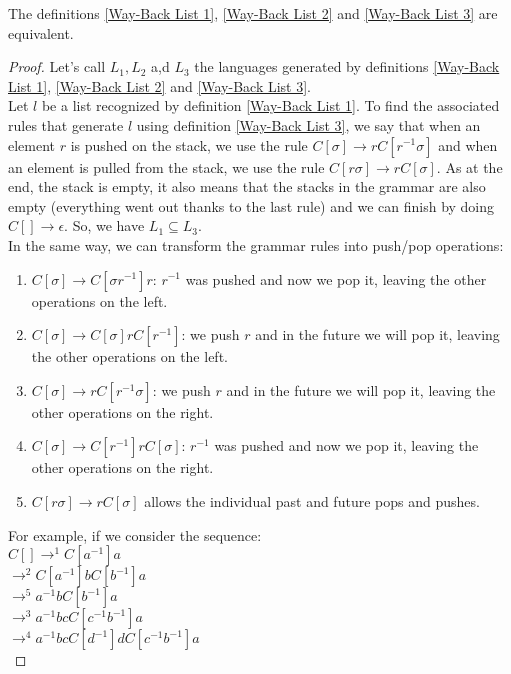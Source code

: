 \documentclass[10pt,a4paper,draft]{article}
\begin{document}
\begin{theorem}
The definitions \ref{Way-Back List 1}, \ref{Way-Back List 2} and \ref{Way-Back List 3} are equivalent.
\end{theorem}

\begin{proof}
Let's call $L_1, L_2$ a,d $L_3$ the languages generated by definitions \ref{Way-Back List 1}, \ref{Way-Back List 2} and \ref{Way-Back List 3}. \\
Let $l$ be a list recognized by definition \ref{Way-Back List 1}. To find the associated rules that generate $l$ using definition \ref{Way-Back List 3}, we say that when an element $r$ is pushed on the stack, we use the rule $C[\sigma] \rightarrow r C[r^{-1} \sigma]$ and when an element is pulled from the stack, we use the rule $C[r \sigma] \rightarrow r C[\sigma]$. As at the end, the stack is empty, it also means that the stacks in the grammar are also empty (everything went out thanks to the last rule) and we can finish by doing $C[] \rightarrow \epsilon$. So, we have $L_1 \subseteq L_3$. \\
In the same way, we can transform the grammar rules into push/pop operations:
\begin{enumerate}
\item $C[\sigma] \rightarrow C[\sigma r^{-1}] r$: $r^{-1}$ was pushed and now we pop it, leaving the other operations on the left.
\item $C[\sigma] \rightarrow C[\sigma] r C[r^{-1}]$: we push $r$ and in the future we will pop it, leaving the other operations on the left.
\item $C[\sigma] \rightarrow r C[r^{-1} \sigma]$: we push $r$ and in the future we will pop it, leaving the other operations on the right.
\item $C[\sigma] \rightarrow C[r^{-1}] r C[\sigma]$: $r^{-1}$ was pushed and now we pop it, leaving the other operations on the right.
\item $C[r \sigma] \rightarrow r C[\sigma]$ allows the individual past and future pops and pushes.
\end{enumerate}
For example, if we consider the sequence:\\
$C[] \rightarrow^1 C[a^{-1}] a$ \\
$\rightarrow^2 C[a^{-1}] b C[b^{-1}] a$\\
$\rightarrow^5 a^{-1} b C[b^{-1}]a$\\
$\rightarrow^3 a^{-1} b c C[c^{-1} b^{-1}] a$ \\
$\rightarrow^4 a^{-1} b c C[d^{-1}] d C[c^{-1} b^{-1}] a$ \\

\end{proof}
\end{document}
